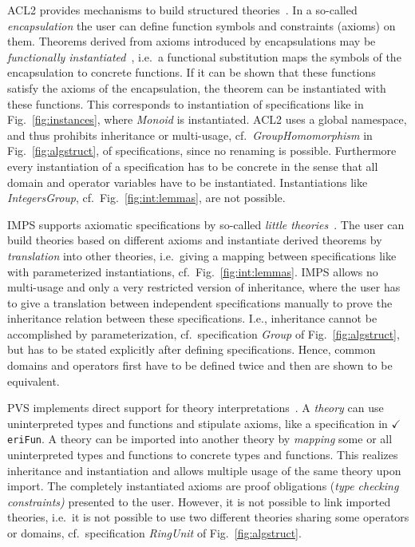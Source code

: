 \documentclass{article}
\theoremstyle{remark}
\theoremstyle{definition}
\newcommand{\VeriFun}{\mbox{{\Large $\checkmark $}\hspace{-0.21cm}\texttt{eriFun}}}
\begin{document}
ACL2 provides mechanisms to build structured theories~\cite{KM:Theory}. In a so-called \emph{encapsulation} the user
can define function symbols and constraints (axioms) on them. Theorems derived from axioms introduced by encapsulations
may be \emph{functionally instantiated}~\cite{BGKM:Instantiation}, i.e.\ a functional substitution maps the symbols of
the encapsulation to concrete functions. If it can be shown that these functions satisfy the axioms of the
encapsulation, the theorem can be instantiated with these functions. This corresponds to instantiation of
specifications like in Fig.~\ref{fig:instances}, where \emph{Monoid} is instantiated. ACL2 uses a global name\-space,
and thus prohibits inheritance or multi-usage, cf.\ \emph{GroupHomomorphism} in Fig.~\ref{fig:algstruct}, of
specifications, since no renaming is possible. Furthermore every instantiation of a specification has to be concrete in
the sense that all domain and operator variables have to be instantiated. Instantiations like \emph{IntegersGroup},
cf.\ Fig.~\ref{fig:int:lemmas}, are not possible.

IMPS supports axiomatic specifications by so-called \emph{little theories}~\cite{FGT:TheoriesIMPS}. The user can build
theories based on different axioms and instantiate derived theorems by \emph{translation} into other theories, i.e.\
giving a mapping between specifications like with parameterized instantiations, cf.\ Fig.~\ref{fig:int:lemmas}. IMPS
allows no multi-usage and only a very restricted version of inheritance, where the user has to give a translation
between independent spe\-cifications manually to prove the inheritance relation between these specifications. I.e.,
inheritance cannot be accomplished by parameterization, cf.\ specification \emph{Group} of Fig.~\ref{fig:algstruct},
but has to be stated explicitly after defining specifications. Hence, common domains and operators first have to be
defined twice and then are shown to be equivalent.

PVS implements direct support for theory interpretations~\cite{OS:TheoryInterpretationsPVS}. A \emph{theory} can use
uninterpreted types and functions and stipulate axioms, like a specification in \VeriFun. A theory can be imported into
another theory by \emph{mapping} some or all uninterpreted types and functions to concrete types and functions. This
realizes inheritance and instantiation and allows multiple usage of the same theory upon import. The completely
instantiated axioms are proof obligations (\emph{type checking constraints)} presented to the user. However, it is not
possible to link imported theories, i.e.\ it is not possible to use two different theories sharing some operators or
domains, cf.\ specification \emph{RingUnit} of Fig.~\ref{fig:algstruct}.
\end{document}
